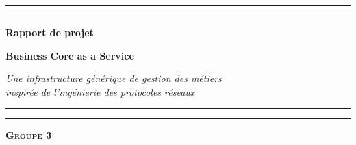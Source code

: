 \documentclass[12pt,a4paper]{report}
\begin{document}
\begin{titlepage}
	{\color{MyBlue}\rule{\linewidth}{1.2pt}}
	\vspace{0.1cm}
	{\color{MyOrange}\rule{\linewidth}{0.5pt}}
	
	\vspace{0.3cm}
	
	\begin{center}
		{\Large \bfseries \color{MyBlue} Rapport de projet}
		
	
		{\sffamily\bfseries\color{MyOrange}\fontsize{34}{38}\selectfont Business Core as a Service\par}
		\vspace{0.1cm} 
		{ \itshape \color{gray!60} Une infrastructure générique de gestion des métiers\\[0.05cm]
			inspirée de l'ingénierie des protocoles réseaux}
	\end{center}
	
	{\color{MyOrange}\rule{\linewidth}{0.5pt}}
	\vspace{0.1cm}
	{\color{MyBlue}\rule{\linewidth}{1.2pt}}
	
	\vspace{0.3cm}
	
	\begin{center}
		{\large \bfseries \color{MyOrange} \textsc{Groupe 3}}
	\end{center}
	
	\vspace{0.2cm}
	

\end{titlepage}
\end{document}
